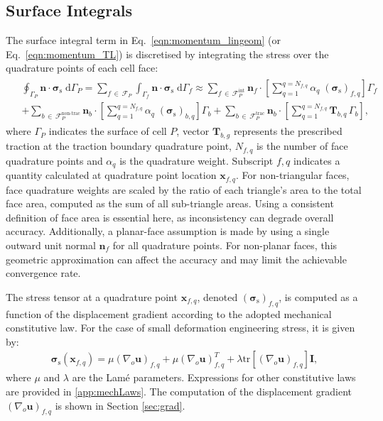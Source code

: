 \documentclass[review,3p]{elsarticle}
\newcommand{\bb}{\boldsymbol}
\begin{document}
\subsection{Surface Integrals}
\label{sec:surf_int}
%
The surface integral term in Eq.~\eqref{eqn:momentum_lingeom} (or Eq.~\eqref{eqn:momentum_TL}) is discretised by integrating the stress over the quadrature points of each cell face:
%
\begin{eqnarray}\label{eq:divStressDiscret}
	\begin{split}
		&\oint_{\Gamma_P} \bb{n} \cdot \bb{\sigma}_\text{s} \; \text{d}\Gamma_P
		=
		\sum_{f \, \in \,\mathcal{F}_P} \int_{\Gamma_f} \bb{n} \cdot \bb{\sigma}_\text{s} \; \text{d}\Gamma_f
		\approx
		\sum_{f \,\in\, \mathcal{F}_P^{\text{int}}} \bb{n}_{f} \cdot \left [ \sum_{q=1}^{q=N_{f,q}}\alpha_q \; (\bb{\sigma}_\text{s})_{f,q} \right]\Gamma_f \\
		& + \sum_{b\, \in \,\mathcal{F}_P^{\text{non-trac}}}  \bb{n}_{b} \cdot \left [ \sum_{q=1}^{q=N_{f,q}}\alpha_q \; (\bb{\sigma}_\text{s})_{b,q} \right]\Gamma_b
		+ \sum_{b\, \in \, \mathcal{F}_P^{\text{trac}}}   \bb{n}_{b} \cdot \left[ \sum_{q=1}^{q=N_{f,q}}\bb{T}_{b,q} \,\Gamma_b\right],
	\end{split}
\end{eqnarray}
%
where $\Gamma_P$ indicates the surface of cell $P$,
vector $\bb{T}_{b,g}$ represents the prescribed traction at the traction boundary quadrature point,
$N_{f,q}$ is the number of face quadrature points and
$\alpha_q$ is the quadrature weight. Subscript ${f,q}$ indicates a quantity calculated at quadrature point location $\bb{x}_{f,q}$.
For non-triangular faces, face quadrature weights are scaled by the ratio of each triangle’s area to the total face area,
computed as the sum of all sub-triangle areas. Using a consistent definition of face area is essential here,
as inconsistency can degrade overall accuracy.
Additionally, a planar-face assumption is made by using a single outward unit normal \(\bb{n}_f\) for all quadrature points.
For non-planar faces, this geometric approximation can affect the accuracy and may limit the achievable convergence rate.

The stress tensor at a quadrature point $\bb{x}_{f,q}$, denoted $(\bb{\sigma}_\text{s})_{f,q}$, is computed as a function of the displacement gradient according to the adopted mechanical constitutive law.
For the case of small deformation engineering stress, it is given by:
\begin{eqnarray}
	\bb{\sigma}_\text{s}(\bb{x}_{f,q}) =   \mu (\nabla_o \bb{u})_{f,q} + \mu (\nabla_o \bb{u})^T_{f,q} +\lambda \text{tr}\left[(\nabla_o \bb{u})_{f,q} \right]\bb{I},
\end{eqnarray}
where $\mu$ and $\lambda$ are the Lamé parameters.
Expressions for other constitutive laws are provided in \ref{app:mechLaws}.
The computation of the displacement gradient $(\nabla_o \bb{u})_{f,q}$ is shown in Section \ref{sec:grad}.
%
\end{document}
